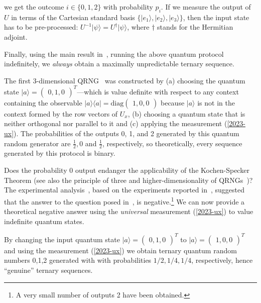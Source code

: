 \documentclass[%
 superscriptaddress,
  preprint,
 showpacs,
 showkeys,
 nofootinbib,
  amsmath,amssymb,
  aps,
 pra,
  longbibliography,
  floatfix,
 ]{revtex4-2}
\theoremstyle{definition}
\begin{document}
we get the outcome
 $i\in \{0,1,2\}$ with probability $p_i$.
 If we  measure the output of $U$ in terms of the
Cartesian standard basis $\{ \vert e_1 \rangle, \vert e_2 \rangle , \vert e_3 \rangle  \}$, then the input state has to be pre-processed: %
$U^{-1}\vert \psi \rangle = U^\dagger \vert \psi \rangle$, where $\dagger$ stands for the  Hermitian adjoint.

Finally, using the main result in~\cite{acs-2015-info6040773}, running the above quantum protocol indefinitely, we {\it always} obtain a maximally unpredictable ternary sequence.


The first 3-dimensional QRNG~\cite{2012-incomput-proofsCJ} was constructed by (a)
choosing the quantum state $\vert a \rangle=\begin{pmatrix}0,1,0
\end{pmatrix}^T$---which is value definite with respect to any context containing the observable $\vert a \rangle \langle a\vert = \text{diag}\begin{pmatrix}1,0,0
\end{pmatrix}$ because $\vert a \rangle$ is not in the context formed by the row vectors of $U_{x}$, (b)  choosing a quantum state that is neither orthogonal nor parallel to
it and (c)  applying the measurement (\ref{2023-ux}).  The probabilities of the outputs 0, 1, and 2 generated by this quantum random generator are $\frac{1}{2},0  $  and $\frac{1}{2}$,  respectively, so theoretically, every sequence generated by this protocol is binary.

 Does the probability 0 output
 endanger the applicability of the Kochen-Specker Theorem (see also the
 principle of three and higher-dimensionality of QRNGs~\cite{svozil-2009-howto})? The experimental analysis~\cite{Abbott_2019}, based on the experiments reported in~\cite{Kulikov2017Dec}, suggested that the answer to the question posed in~\cite{Arkady_Fedorov-pc},  is negative.\footnote{A very small number of outputs 2 have been obtained.} We can now provide a theoretical negative answer using the {\it universal} measurement (\ref{2023-ux}) to value indefinite quantum states.






By  changing the input quantum state $\vert a \rangle = \begin{pmatrix} 0, 1 , 0  \end{pmatrix}^T$
  to $\vert a \rangle = \begin{pmatrix} 1 , 0 , 0 \end{pmatrix}^T$ and using the  measurement (\ref{2023-ux})
 we obtain ternary quantum random numbers 0,1,2 generated with with probabilities $1/2,1/4,1/4$, respectively,  hence
  ``genuine'' ternary sequences.
\end{document}
